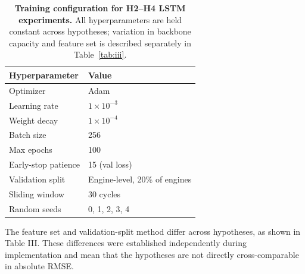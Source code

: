 \documentclass[review,12pt]{elsarticle}
\begin{document}
\begin{table}[!t]
\centering
\small
\caption*{\textbf{Training configuration for H2--H4 LSTM experiments.} All hyperparameters are held constant across hypotheses; variation in backbone capacity and feature set is described separately in Table~\ref{tab:iii}.}
\label{tab:5}
\begin{tabular}{ll}
\toprule
\textbf{Hyperparameter} & \textbf{Value} \\
\midrule
Optimizer & Adam \\
Learning rate & $1\times10^{-3}$ \\
Weight decay & $1\times10^{-4}$ \\
Batch size & 256 \\
Max epochs & 100 \\
Early-stop patience & 15 (val loss) \\
Validation split & Engine-level, 20\% of engines \\
Sliding window & 30 cycles \\
Random seeds & {0, 1, 2, 3, 4} \\
\bottomrule
\end{tabular}
\end{table}


The feature set and validation-split method differ across hypotheses, as shown in Table III. These differences were established independently during implementation and mean that the hypotheses are not directly cross-comparable in absolute RMSE.

\begin{table}[!t]
\centering
\small
\caption{Feature set, validation split, and backbone by hypothesis}
\label{tab:iii}
\end{table}
\end{document}
